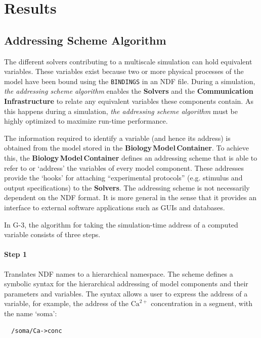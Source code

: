 \documentclass[11pt,3p,twocolumn]{JMN}
\begin{document}
\section{Results}

\subsection{Addressing Scheme Algorithm}

The different solvers contributing to a multiscale simulation can hold equivalent variables.  These variables exist because two or more physical processes of the model have been bound using the {\tt BINDINGS} in an NDF file.  During a simulation, {\it the addressing scheme algorithm} enables the {\bf Solvers} and the {\bf Communication\,Infrastructure} to relate any equivalent variables these components contain.  As this happens during a simulation, {\it the addressing scheme algorithm} must be highly optimized to maximize run-time performance.

The information required to identify a variable (and hence its address) is obtained from the model stored in the {\bf Biology\,Model\,Container}. To achieve this, the {\bf Biology\,Model\,Container} defines an addressing scheme that is able to refer to or `address' the variables of every model component. These addresses provide the `hooks' for attaching ``experimental protocols'' (e.g. stimulus and output specifications) to the {\bf Solvers}.  The addressing scheme is not necessarily dependent on the NDF format. It is more general in the sense that it provides an interface to external software applications such as GUIs and databases.

In G-3, the algorithm for taking the simulation-time address of a computed variable consists of three steps.

\paragraph{Step 1} Translates NDF names to a hierarchical namespace. The scheme defines a symbolic syntax for the hierarchical addressing of model components and their parameters and variables.  The syntax allows a user to express the address of a variable, for example, the address of the $\mathrm{Ca}^{2+}$ concentration in a segment, with the name `soma':

\begin{tiny}
\begin{verbatim}
  /soma/Ca->conc
\end{verbatim}
\end{tiny}
\end{document}
